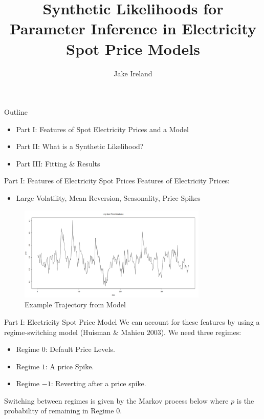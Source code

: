 \documentclass{beamer}
\title[Synthetic Likelihoods]{Synthetic Likelihoods for Parameter Inference in Electricity Spot Price Models}
\author{Jake Ireland}
\date{}
\begin{document}
\frame{\titlepage}

\begin{frame}{Outline}
        \begin{itemize}
            \item Part I: Features of Spot Electricity Prices and a Model
            \item Part II: What is a Synthetic Likelihood?
            \item Part III: Fitting \& Results
        \end{itemize}
\end{frame}

\begin{frame}{Part I: Features of Electricity Spot Prices}
    Features of Electricity Prices:
    \begin{itemize}
        \item Large Volatility, Mean Reversion, Seasonality, Price Spikes
    \end{itemize}
    
    \begin{figure}[H]
        \centering
        \includegraphics[width=90mm]{ex_traj.png}
        \caption{Example Trajectory from Model}
    \end{figure}
\end{frame}

\begin{frame}{Part I: Electricity Spot Price Model}
    We can account for these features by using a regime-switching model (Huisman \& Mahieu 2003). We need three regimes:
    \begin{itemize}
        \item Regime $0$: Default Price Levels.
        \item Regime $1$: A price Spike.
        \item Regime $-1$: Reverting after a price spike.
    \end{itemize}
    Switching between regimes is given by the Markov process below where $p$ is the probability of remaining in Regime $0$.
    
    
\end{frame}
\end{document}
